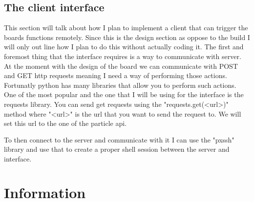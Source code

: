 \documentclass{article}
\begin{document}
\subsection{The client interface}
This section will talk about how I plan to implement a client that can trigger the boards functions
remotely. Since this is the design section as oppose to the build I will only out line how I plan to
do this without actually coding it. The first and foremost thing that the interface requires is a
way to communicate with server. At the moment with the design of the board we can communicate with
POST and GET http requests meaning I need a way of performing those actions. Fortunatly python has
many libraries that allow you to perform such actions. One of the most popular and the one that I
will be using for the interface is the requests library\cite{pythonRequests}. You can send get
requests using the "requests.get(<url>)" method where "<url>" is the url that you want to send the
request to. We will set this url to the one of the particle api.

To then connect to the server and communicate with it I can use the "pxssh" library and use that to
create a proper shell session between the server and interface. 


\pagebreak

\section{Information}
\end{document}

